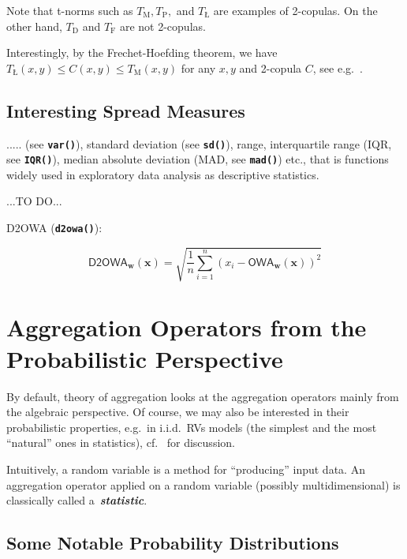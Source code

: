 \documentclass[11pt]{article}\usepackage[]{graphicx}\usepackage[]{color}
\newcommand{\hlkwd}[1]{\textcolor[rgb]{0.737,0.353,0.396}{\textbf{#1}}}%
\renewcommand{\emph}[1]{\textbf{\textsl{#1}}}
\newcommand{\Rfunc}[1]{\texttt{\hlkwd{#1}}}
\newcommand{\vect}[1]{{\mathbf{#1}}}
\newcommand{\func}[1]{{\mathsf{#1}}}
\theoremstyle{remark}
\theoremstyle{definition}
\begin{document}
Note that t-norms such as $T_\mathrm{M}, T_\mathrm{P},$ and $T_\mathrm{Ł}$
are examples of 2-copulas.
On the other hand, $T_\mathrm{D}$ and $T_\mathrm{F}$ are not 2-copulas.

Interestingly, by the Frechet-Hoefding theorem,
we have $T_\mathrm{Ł}(x, y)\le C(x,y)\le T_\mathrm{M}(x,y)$ for
any $x,y$ and 2-copula $C$, see e.g.~\cite{KlementMesiarPap2000:trinorm}.

\subsection{Interesting Spread Measures}

.....
(see \Rfunc{var()}), standard deviation
(see \Rfunc{sd()}), range, interquartile range
(IQR, see \Rfunc{IQR()}),
median absolute deviation (MAD, see \Rfunc{mad()}) etc., that is
functions widely used in exploratory data analysis
as descriptive statistics.

...TO DO...

D2OWA (\index{\Rfunc{d2owa()}}\Rfunc{d2owa()}):

\[
\func{D2OWA}_\vect{w}(\vect{x}) = \sqrt{\frac{1}{n}
   \sum_{i=1}^n \left(x_i-\func{OWA}_\vect{w}(\vect{x})\right)^2}
\]





\section{Aggregation Operators from the Probabilistic Perspective}

By default, theory of aggregation looks at the aggregation operators
mainly from the algebraic perspective. Of course, we may also
be interested in their probabilistic properties,
e.g.~in i.i.d.~RVs models (the simplest and the most ``natural''
ones in statistics), cf.~\cite{Gagolewski2011:PhD} for discussion.

Intuitively, a random variable is a method for ``producing''
input data. An aggregation operator applied on a random variable
(possibly multidimensional) is classically called a~\emph{statistic}.




\subsection{Some Notable Probability Distributions}
\end{document}
